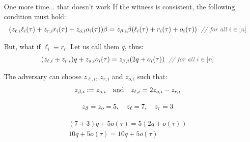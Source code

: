 \documentclass{zkdl-presentation-template}
\begin{document}
    \begin{frame}{One more time... that doesn't work}
        If the witness is consistent, the following condition must hold:
        \vspace{-3pt}
        {\small \begin{equation*}
            (z_{\ell,i}\ell_i(\tau) + z_{r,i}r_i(\tau) + z_{o,i}o_i(\tau))\beta = z_{\beta,i}\beta(\ell_i(\tau) + r_i(\tau) + o_i(\tau)) \; \commentgray{for all $i \in [n]$}
            \vspace{-10pt}
        \end{equation*}}
        \pause

        But, what if $\ell_i \equiv r_i$. Let us call them $q$, thus:
        \vspace{-3pt}
        \begin{equation*}
            (z_{\ell,i} + z_{r,i})q + z_{o,i}o_i(\tau)= z_{\beta,i}(2q + o_i(\tau)) \; \commentgray{for all $i \in [n]$}
            \vspace{-10pt}
        \end{equation*}
        \pause

        The adversary can choose $z_{\ell,i}$, $z_{r,i}$ and $z_{o,i}$ such that:
        \vspace{-5pt}
        \begin{equation*}
            z_{\beta,i} := z_{o,i} \quad \text{and} \quad z_{\ell,i}=2z_{o,i} - z_{r,i}
            \vspace{-5pt}
        \end{equation*}
        \pause

        \begin{example}
            \begin{equation*}
                z_{\beta} = z_o = 5, \quad z_{\ell} = 7, \quad z_r = 3
                \vspace{-25pt}
            \end{equation*}

            \begin{align*}
                (7 + 3)q + 5o(\tau) = 5(2q + o(\tau)) \\
                10q + 5o(\tau) = 10q + 5o(\tau)
            \end{align*}
        \end{example}
    \end{frame}
\end{document}
